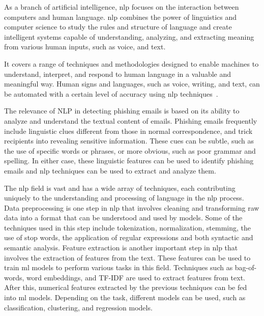 
As a branch of artificial intelligence, \ac{nlp} focuses on the interaction between computers and human language. \ac{nlp} combines the power of linguistics and computer science to study the rules and structure of language and create intelligent systems capable of understanding, analyzing, and extracting meaning from various human inputs, such as voice, and text.

It covers a range of techniques and methodologies designed to enable machines to understand, interpret, and respond to human language in a valuable and meaningful way. Human signs and languages, such as voice, writing, and text, can be automated with a certain level of accuracy using \ac{nlp} techniques~\cite{Sathish20231612}.

The relevance of NLP in detecting phishing emails is based on its ability to analyze and understand the textual content of emails. Phishing emails frequently include linguistic clues different from those in normal correspondence, and trick recipients into revealing sensitive information. These cues can be subtle, such as the use of specific words or phrases, or more obvious, such as poor grammar and spelling. In either case, these linguistic features can be used to identify phishing emails and \ac{nlp} techniques can be used to extract and analyze them.

The \ac{nlp} field is vast and has a wide array of techniques, each contributing uniquely to the understanding and processing of language in the \ac{nlp} process. Data preprocessing is one step in \ac{nlp} that involves cleaning and transforming raw data into a format that can be understood and used by models. Some of the techniques used in this step include tokenization, normalization, stemming, the use of stop words, the application of regular expressions and both syntactic and semantic analysis.
Feature extraction is another important step in \ac{nlp} that involves the extraction of features from the text. These features can be used to train \ac{ml} models to perform various tasks in this field. Techniques such as bag-of-words, word embeddings, and TF-IDF are used to extract features from text.
After this, numerical features extracted by the previous techniques can be fed into \ac{ml} models. Depending on the task, different models can be used, such as classification, clustering, and regression models.

